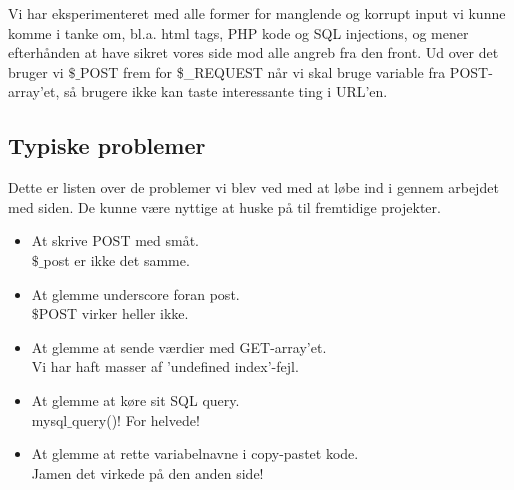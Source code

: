 \documentclass{article}
\begin{document}
Vi har eksperimenteret med alle former for manglende og korrupt input vi kunne komme i tanke om, bl.a. html tags, PHP kode og SQL injections, og mener efterhånden at have sikret vores side mod alle angreb fra den front. Ud over det bruger vi $\$$$\_$POST frem for \$\_REQUEST når vi skal bruge variable fra POST-array'et, så brugere ikke kan taste interessante ting i URL'en.

\subsection{Typiske problemer}
Dette er listen over de problemer vi blev ved med at løbe ind i gennem arbejdet med siden. De kunne være nyttige at huske på til fremtidige projekter.

\begin{itemize}
	\item At skrive POST med småt. \\
		$\$$$\_$post er ikke det samme.
	\item At glemme underscore foran post. \\
		$\$$POST virker heller ikke.
	\item At glemme at sende værdier med GET-array'et. \\
		Vi har haft masser af 'undefined index'-fejl.
	\item At glemme at køre sit SQL query. \\
		mysql$\_$query()! For helvede!
	\item At glemme at rette variabelnavne i copy-pastet kode. \\
		Jamen det virkede på den anden side!
\end{itemize}
\end{document}

